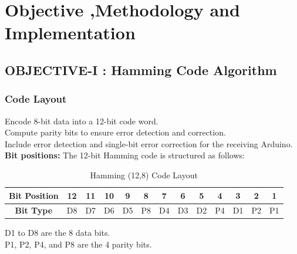 \documentclass{article}
\numberwithin{equation}{section}
\numberwithin{figure}{section}
\numberwithin{table}{section}
\begin{document}
\section{Objective ,Methodology and Implementation}
\subsection{OBJECTIVE-I : Hamming Code Algorithm}
\subsubsection{Code Layout}
Encode 8-bit data into a 12-bit code word.\\
Compute parity bits to ensure error detection and correction.\\
Include error detection and single-bit error correction for the receiving Arduino.\\
\textbf{Bit positions: }
The 12-bit Hamming code is structured as follows:

   \begin{table}[h!]
    \centering
    \caption{Hamming (12,8) Code Layout}

    \begin{tabular}{|c|c|c|c|c|c|c|c|c|c|c|c|c|}
        \hline
        \textbf{Bit Position} & 12 & 11 & 10 & 9 & 8 & 7 & 6 & 5 & 4 & 3 & 2 & 1 \\
        \hline
        \textbf{Bit Type} & D8 & D7 & D6 & D5 & P8 & D4 & D3 & D2 & P4 & D1 & P2 & P1 \\
        \hline
    \end{tabular}
   
\end{table}
       \noindent  D1 to D8 are the 8 data bits.\\
        P1, P2, P4, and P8 are the 4 parity bits. \cite{attarian2006coding}
\end{document}
